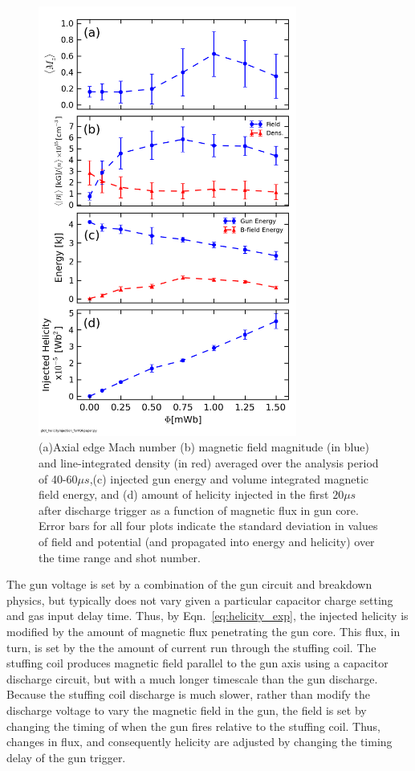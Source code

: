 \documentclass[aps,prl,amsmath,amssymb,reprint,superscriptaddress]{revtex4-1} %
\begin{document}
\begin{figure}[!htbp]
\centerline{
\includegraphics[width=8.5cm]{helicity_scaling.png}}
\caption{\label{fig:helicity_scaling} (a)Axial edge Mach number (b) magnetic field magnitude (in blue) and line-integrated density (in red) averaged over the analysis period of 40-60$\mu s$,(c) injected gun energy and volume integrated magnetic field energy, and (d) amount of helicity injected in the first $20 \mu s$ after discharge trigger as a function of magnetic flux in gun core. Error bars for all four plots indicate the standard deviation in values of field and potential (and propagated into energy and helicity) over the time range and shot number.}
\end{figure}

The gun voltage is set by a combination of the gun circuit and breakdown physics, but typically does not vary given a particular capacitor charge setting and gas input delay time. Thus, by Eqn.~\ref{eq:helicity_exp}, the injected helicity is modified by the amount of magnetic flux penetrating the gun core. This flux, in turn, is set by the the amount of current run through the stuffing coil. The stuffing coil produces magnetic field parallel to the gun axis using a capacitor discharge circuit, but with a much longer timescale than the gun discharge. Because the stuffing coil discharge is much slower, rather than modify the discharge voltage to vary the magnetic field in the gun, the field is set by changing the timing of when the gun fires relative to the stuffing coil. Thus, changes in flux, and consequently helicity are adjusted by changing the timing delay of the gun trigger.
\end{document}
